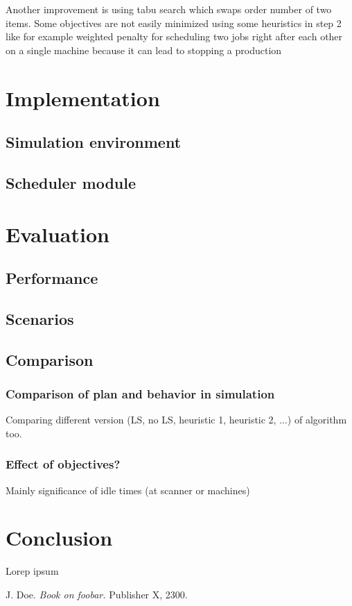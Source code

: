 \documentclass{ctuthesis}
\begin{document}
Another improvement is using tabu search which swaps order number of two items. Some objectives are not easily minimized using some heuristics in step 2 like for example weighted penalty for scheduling two jobs right after each other on a single machine because it can lead to stopping a production

\chapter{Implementation}
\section{Simulation environment}
\section{Scheduler module}
\chapter{Evaluation}
\section{Performance}
\section{Scenarios}
\section{Comparison}
\subsection{Comparison of plan and behavior in simulation}
Comparing different version (LS, no LS, heuristic 1, heuristic 2, ...) of algorithm too.
\subsection{Effect of objectives?}
Mainly significance of idle times (at scanner or machines)
\chapter{Conclusion}

Lorep ipsum \cite{doe}

\begin{thebibliography}{1}

 J. Doe. \emph{Book on foobar.} Publisher X,
 2300.

\end{thebibliography}
\end{document}
